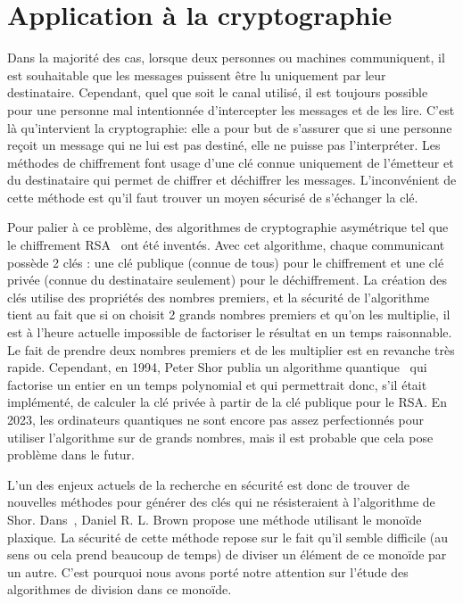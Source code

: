 \section{Application à la cryptographie}
Dans la majorité des cas, lorsque deux personnes ou machines communiquent, il est souhaitable que les messages puissent être lu uniquement par  leur destinataire. Cependant, quel que soit le canal utilisé, il est toujours possible pour une personne mal intentionnée d'intercepter les messages et de les lire. C'est là qu'intervient la cryptographie: elle a pour but de s'assurer que si une personne reçoit un message qui ne lui est pas destiné, elle ne puisse pas l'interpréter. Les méthodes de chiffrement font usage d'une clé connue uniquement de l'émetteur et du destinataire qui permet de chiffrer et déchiffrer les messages. L'inconvénient de cette méthode est qu'il faut trouver un moyen sécurisé de s'échanger la clé.

Pour palier à ce problème, des algorithmes de cryptographie asymétrique tel que le chiffrement RSA~\cite{rivest1978method} ont été inventés. Avec cet algorithme, chaque communicant possède 2 clés : une clé publique (connue de tous) pour le chiffrement et une clé privée (connue du destinataire seulement) pour le déchiffrement. La création des clés utilise des propriétés des nombres premiers, et la sécurité de l'algorithme tient au fait que si on choisit 2 grands nombres premiers et qu'on les multiplie, il est à l'heure actuelle impossible de factoriser le résultat en un temps raisonnable. Le fait de prendre deux nombres premiers et de les multiplier est en revanche très rapide. Cependant, en 1994, Peter Shor publia un algorithme quantique~\cite{Shor} qui factorise un entier en un temps polynomial et qui permettrait donc, s'il était implémenté, de calculer la clé privée à partir de la clé publique pour le RSA. En 2023, les ordinateurs quantiques ne sont encore pas assez perfectionnés pour utiliser l'algorithme sur de grands nombres, mais il est probable que cela pose problème dans le futur.

L'un des enjeux actuels de la recherche en sécurité est donc de trouver de nouvelles méthodes pour générer des clés qui ne résisteraient à l'algorithme de Shor. Dans~\cite{Brown+2023}, Daniel R. L. Brown propose une méthode utilisant le monoïde plaxique. La sécurité de cette méthode repose sur le fait qu'il semble difficile (au sens ou cela prend beaucoup de temps) de diviser un élément de ce monoïde par un autre. C'est pourquoi nous avons porté notre attention sur l'étude des algorithmes de division dans ce monoïde.

